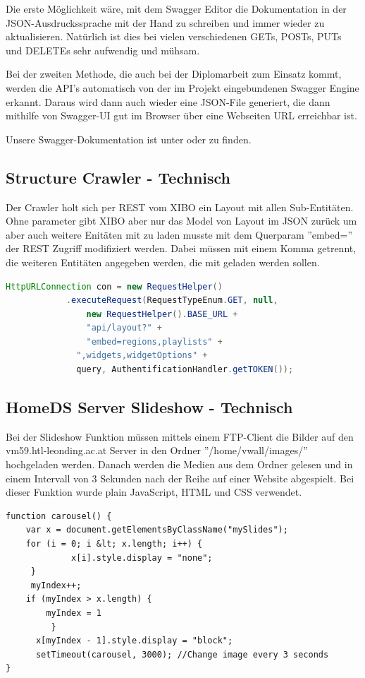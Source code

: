 Die erste Möglichkeit wäre, mit dem Swagger Editor die Dokumentation in der JSON-Ausdruckssprache mit der Hand zu schreiben und immer wieder zu aktualisieren. Natürlich ist dies bei vielen verschiedenen GETs, POSTs, PUTs und DELETEs sehr aufwendig und mühsam.

Bei der zweiten Methode, die auch bei der Diplomarbeit zum Einsatz kommt, werden die API's automatisch von der im Projekt eingebundenen Swagger Engine erkannt. Daraus wird dann auch wieder eine JSON-File generiert, die dann mithilfe von Swagger-UI gut im Browser über eine Webseiten URL erreichbar ist.

Unsere Swagger-Dokumentation ist unter   oder  zu finden. \cite{swagger}

\subsection{Structure Crawler - Technisch}\label{sec:structurecrawlertechnical}
Der Crawler holt sich per REST vom XIBO ein Layout mit allen Sub-Entitäten. Ohne parameter gibt XIBO aber nur das Model von Layout im JSON zurück um aber auch weitere Enitäten mit zu laden musste mit dem Querparam  ''embed='' der REST Zugriff modifiziert werden. Dabei müssen mit einem Komma getrennt, die weiteren Entitäten angegeben werden, die mit geladen werden sollen.

\begin{lstlisting}[language=Java, caption={Crawler GET Request}]
HttpURLConnection con = new RequestHelper()
         	.executeRequest(RequestTypeEnum.GET, null,
             	new RequestHelper().BASE_URL + 
             	"api/layout?" + 
             	"embed=regions,playlists" + 
              ",widgets,widgetOptions" + 
              query, AuthentificationHandler.getTOKEN());
\end{lstlisting}

\subsection{HomeDS Server Slideshow - Technisch}\label{sec:slideshowtechnical}
Bei der Slideshow Funktion müssen mittels einem FTP-Client die Bilder auf den vm59.htl-leonding.ac.at Server in den Ordner ''/home/vwall/images/'' hochgeladen werden. Danach werden die Medien aus dem Ordner gelesen und in einem Intervall von 3 Sekunden nach der Reihe auf einer Website abgespielt. Bei dieser Funktion wurde plain JavaScript, HTML und CSS verwendet.

\begin{lstlisting}[caption={Carousel JavaScript}]
function carousel() {
    var x = document.getElementsByClassName("mySlides");
    for (i = 0; i &lt; x.length; i++) {
    		 x[i].style.display = "none";
  	 }
     myIndex++;
   	if (myIndex > x.length) {
   		myIndex = 1
    	 }
      x[myIndex - 1].style.display = "block";
      setTimeout(carousel, 3000); //Change image every 3 seconds
}
\end{lstlisting}
